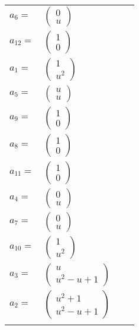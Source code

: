 \documentclass[1p]{elsarticle_modified}
\theoremstyle{definition}
\begin{document}
\begin{tabular}{m{7pt} m{180pt} m{7pt} m{180pt} }
\flushright $a_{6}=$&$\begin{pmatrix}0\\u\end{pmatrix}$ \\
\flushright $a_{12}=$&$\begin{pmatrix}1\\0\end{pmatrix}$ \\
\flushright $a_{1}=$&$\begin{pmatrix}1\\u^2\end{pmatrix}$ \\
\flushright $a_{5}=$&$\begin{pmatrix}u\\u\end{pmatrix}$ \\
\flushright $a_{9}=$&$\begin{pmatrix}1\\0\end{pmatrix}$ \\
\flushright $a_{8}=$&$\begin{pmatrix}1\\0\end{pmatrix}$ \\
\flushright $a_{11}=$&$\begin{pmatrix}1\\0\end{pmatrix}$ \\
\flushright $a_{4}=$&$\begin{pmatrix}0\\u\end{pmatrix}$ \\
\flushright $a_{7}=$&$\begin{pmatrix}0\\u\end{pmatrix}$ \\
\flushright $a_{10}=$&$\begin{pmatrix}1\\u^2\end{pmatrix}$ \\
\flushright $a_{3}=$&$\begin{pmatrix}u\\u^2- u+1\end{pmatrix}$ \\
\flushright $a_{2}=$&$\begin{pmatrix}u^2+1\\u^2- u+1\end{pmatrix}$\\&\end{tabular}
\end{document}
